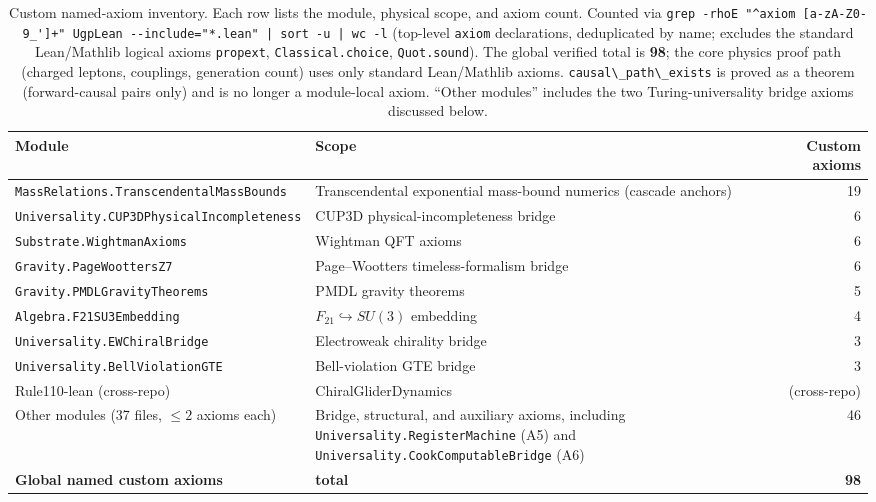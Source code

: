 \documentclass[11pt,a4paper]{article}
\theoremstyle{definition}
\begin{document}
\begin{table}[h]
\centering\small
\begin{tabular}{@{}p{6.2cm}p{4.5cm}r@{}}
\toprule
Module & Scope & Custom axioms \\
\midrule
\texttt{MassRelations.TranscendentalMassBounds} & Transcendental exponential mass-bound numerics (cascade anchors) & 19 \\
\texttt{Universality.CUP3DPhysicalIncompleteness} & CUP3D physical-incompleteness bridge & 6 \\
\texttt{Substrate.WightmanAxioms}     & Wightman QFT axioms & 6 \\
\texttt{Gravity.PageWoottersZ7}       & Page--Wootters timeless-formalism bridge & 6 \\
\texttt{Gravity.PMDLGravityTheorems}  & PMDL gravity theorems & 5 \\
\texttt{Algebra.F21SU3Embedding}      & $F_{21}\hookrightarrow SU(3)$ embedding & 4 \\
\texttt{Universality.EWChiralBridge}  & Electroweak chirality bridge & 3 \\
\texttt{Universality.BellViolationGTE} & Bell-violation GTE bridge & 3 \\
Rule110-lean (cross-repo)             & ChiralGliderDynamics & (cross-repo) \\
\hline
Other modules (37 files, $\le 2$ axioms each) & Bridge, structural, and auxiliary axioms, including \texttt{Universality.RegisterMachine} (A5) and \texttt{Universality.CookComputableBridge} (A6) & 46 \\
\hline
\textbf{Global named custom axioms}   & \textbf{total} & \textbf{98} \\
\bottomrule
\end{tabular}
\caption{Custom named-axiom inventory. Each row lists the module, physical scope,
  and axiom count. Counted via
  \lstinline!grep -rhoE "^axiom [a-zA-Z0-9_']+" UgpLean --include="*.lean" | sort -u | wc -l!
  (top-level \texttt{axiom} declarations, deduplicated by name; excludes the standard
  Lean/Mathlib logical axioms \texttt{propext}, \texttt{Classical.choice},
  \texttt{Quot.sound}). The global verified total is \textbf{98}; the core physics
  proof path (charged leptons, couplings, generation count) uses only standard
  Lean/Mathlib axioms. \lstinline|causal\_path\_exists| is proved as a theorem
  (forward-causal pairs only) and is no longer a module-local axiom.
  ``Other modules'' includes the two Turing-universality bridge axioms discussed below.}
\label{tab:axiom-inventory}
\end{table}
\end{document}
